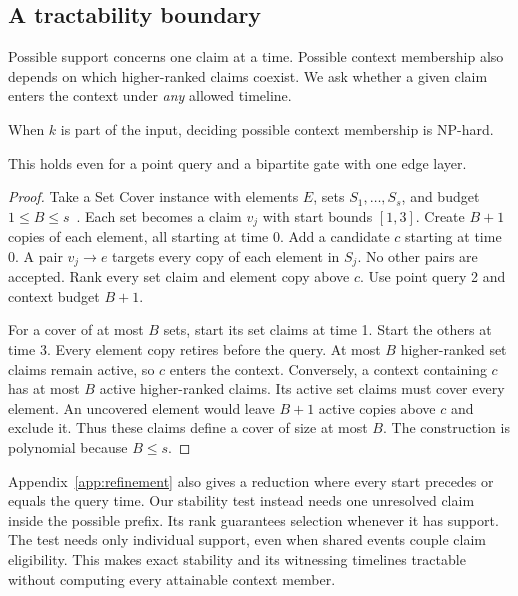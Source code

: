 \subsection{A tractability boundary}
Possible support concerns one claim at a time.
Possible context membership also depends on which higher-ranked claims coexist.
We ask whether a given claim enters the context under \emph{any} allowed timeline.
\begin{theorem}
\label{thm:hardness}
When $k$ is part of the input, deciding possible context membership is NP-hard.
\end{theorem}
This holds even for a point query and a bipartite gate with one edge layer.
\begin{proof}
Take a Set Cover instance with elements $E$, sets $S_1,\ldots,S_s$, and budget $1\le B\le s$~\citep{karp1972reducibility}.
Each set becomes a claim $v_j$ with start bounds $[1,3]$.
Create $B+1$ copies of each element, all starting at time 0.
Add a candidate $c$ starting at time 0.
A pair $v_j\to e$ targets every copy of each element in $S_j$.
No other pairs are accepted.
Rank every set claim and element copy above $c$.
Use point query 2 and context budget $B+1$.

For a cover of at most $B$ sets, start its set claims at time 1.
Start the others at time 3.
Every element copy retires before the query.
At most $B$ higher-ranked set claims remain active, so $c$ enters the context.
Conversely, a context containing $c$ has at most $B$ active higher-ranked claims.
Its active set claims must cover every element.
An uncovered element would leave $B+1$ active copies above $c$ and exclude it.
Thus these claims define a cover of size at most $B$.
The construction is polynomial because $B\le s$.
\end{proof}
Appendix~\ref{app:refinement} also gives a reduction where every start precedes or equals the query time.
Our stability test instead needs one unresolved claim inside the possible prefix.
Its rank guarantees selection whenever it has support.
The test needs only individual support, even when shared events couple claim eligibility.
This makes exact stability and its witnessing timelines tractable without computing every attainable context member.

